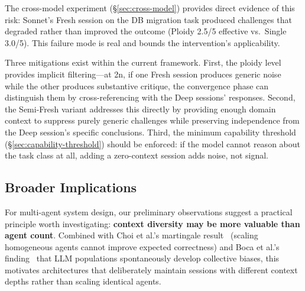 \documentclass[11pt]{article}
\begin{document}
The cross-model experiment (\S\ref{sec:cross-model}) provides direct evidence of this risk: Sonnet's Fresh session on the DB migration task produced challenges that degraded rather than improved the outcome (Ploidy 2.5/5 effective vs.\ Single 3.0/5). This failure mode is real and bounds the intervention's applicability.

Three mitigations exist within the current framework. First, the ploidy level provides implicit filtering---at 2n, if one Fresh session produces generic noise while the other produces substantive critique, the convergence phase can distinguish them by cross-referencing with the Deep sessions' responses. Second, the Semi-Fresh variant addresses this directly by providing enough domain context to suppress purely generic challenges while preserving independence from the Deep session's specific conclusions. Third, the minimum capability threshold (\S\ref{sec:capability-threshold}) should be enforced: if the model cannot reason about the task class at all, adding a zero-context session adds noise, not signal.

\subsection{Broader Implications}
\label{sec:implications}

For multi-agent system design, our preliminary observations suggest a practical principle worth investigating: \textbf{context diversity may be more valuable than agent count}. Combined with Choi et al.'s martingale result~\citep{choi2025debate} (scaling homogeneous agents cannot improve expected correctness) and Boca et al.'s finding~\citep{boca2025emergent} that LLM populations spontaneously develop collective biases, this motivates architectures that deliberately maintain sessions with different context depths rather than scaling identical agents.
\end{document}
